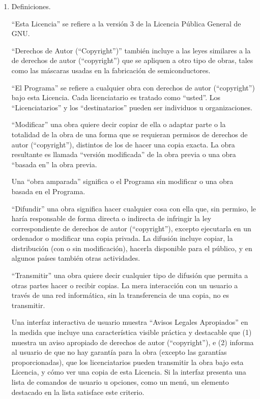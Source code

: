 \documentclass[11pt]{article}
\begin{document}
\begin{enumerate}

\addtocounter{enumi}{-1}

\item Definiciones.

``Esta Licencia'' se refiere a la versi\'{o}n 3 de la Licencia P\'{u}blica 
General de GNU.

``Derechos de Autor (``Copyright'')'' tambi\'{e}n incluye a las leyes similares a la de derechos de autor (``copyright'') 
que se apliquen a otro tipo de obras, tales como las m\'{a}scaras usadas 
en la fabricaci\'{o}n de semiconductores.

``El Programa'' se refiere a cualquier obra con derechos de autor (``copyright'') 
bajo esta Licencia.  Cada licenciatario es tratado como ``usted''. Los ``Licenciatarios'' y los ``destinatarios'' pueden ser individuos u organizaciones.

``Modificar'' una obra quiere decir copiar de ella o adaptar parte o la 
totalidad de la obra de una forma que se requieran permisos de derechos de autor (``copyright''), 
distintos de los de hacer una copia exacta. La obra resultante es 
llamada ``versi\'{o}n modificada'' de la obra previa o una obra ``basada en'' 
la obra previa.

Una ``obra amparada'' significa o el Programa sin modificar o una obra 
basada en el Programa.

``Difundir'' una obra significa hacer cualquier cosa con ella que, sin
permiso, le har\'{i}a responsable de forma directa o indirecta de infringir
la ley correspondiente de derechos de autor (``copyright''), excepto ejecutarla en un ordenador
o modificar una copia privada. La difusi\'{o}n incluye copiar, la 
distribuci\'{o}n (con o sin modificaci\'{o}n), hacerla disponible para el 
p\'{u}blico, y en algunos pa\'{i}ses tambi\'{e}n otras actividades.

``Transmitir'' una obra quiere decir cualquier tipo de difusi\'{o}n que 
permita a otras partes hacer o recibir copias.  La mera interacci\'{o}n con
un usuario a trav\'{e}s de una red inform\'{a}tica, sin la transferencia de una 
copia, no es transmitir.

Una interfaz interactiva de usuario muestra ``Avisos Legales Apropiados''
en la medida que incluye una caracter\'{i}stica visible pr\'{a}ctica y 
destacable que (1) muestra un aviso apropiado de derechos de autor (``copyright''), e (2)
informa al usuario de que no hay garant\'{i}a para la obra (excepto las 
garant\'{i}as proporcionadas), que los licenciatarios pueden transmitir la 
obra bajo esta Licencia, y c\'{o}mo ver una copia de esta Licencia. 
Si la interfaz presenta una lista de comandos de usuario u opciones, 
como un men\'{u}, un elemento destacado en la lista satisface este criterio.


\end{enumerate}
\end{document}
